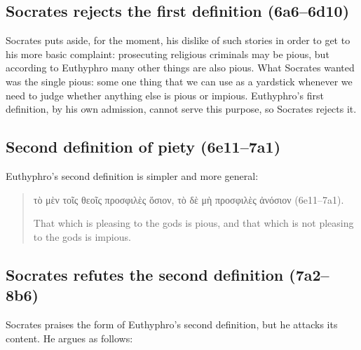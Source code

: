 \documentclass[11pt]{article}
\begin{document}
\subsection{Socrates rejects the first definition (6a6--6d10)}

Socrates puts aside, for the moment, his dislike of such stories in order to get to his more basic complaint: prosecuting religious criminals may be pious, but according to Euthyphro many other things are also pious.  What Socrates wanted was the single pious: some one thing that we can use as a yardstick whenever we need to judge whether anything else is pious or impious.  Euthyphro's first definition, by his own admission, cannot serve this purpose, so Socrates rejects it.

\subsection{Second definition of piety (6e11--7a1)}

Euthyphro's second definition is simpler and more general:

\begin{quote}
    {\g τὸ μὲν τοῖς θεοῖς προσφιλὲς ὅσιον, τὸ δὲ μὴ προσφιλὲς ἀνόσιον} (6e11--7a1).

    That which is pleasing to the gods is pious, and that which is not pleasing to the gods is impious.
\end{quote}

\subsection{Socrates refutes the second definition (7a2--8b6)}

Socrates praises the form of Euthyphro's second definition, but he attacks its content.  He argues as follows:
\end{document}
